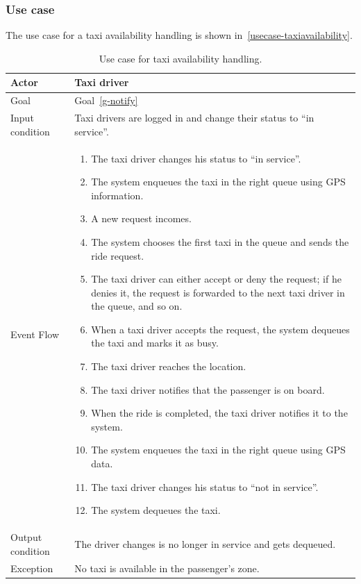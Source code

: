 \subsubsection{Use case}
The use case for a taxi availability handling is shown in~\autoref{usecase-taxiavailability}.

\begin{table}
\begin{center}
\begin{tabular}{| l | p{} |}
\hline
Actor & Taxi driver \\
\hline
Goal & Goal~\ref{g-notify}
\\
\hline
Input condition & Taxi drivers are logged in and change their status to ``in service''.  \\
\hline
Event Flow & \begin{enumerate}
	\item The taxi driver changes his status to ``in service''.
	\item The system enqueues the taxi in the right queue using GPS information.
	\item A new request incomes.
	\item The system chooses the first taxi in the queue and sends the ride request.
	\item The taxi driver can either accept or deny the request; if he denies it, the request is forwarded to the next taxi driver in the queue, and so on.
	\item When a taxi driver accepts the request, the system dequeues the taxi and marks it as busy.
	\item The taxi driver reaches the location.
	\item The taxi driver notifies that the passenger is on board.
	\item When the ride is completed, the taxi driver notifies it to the system.
	\item The system enqueues the taxi in the right queue using GPS data.
	\item The taxi driver changes his status to ``not in service''.
	\item The system dequeues the taxi.
\end{enumerate}
\\
\hline
Output condition & The driver changes is no longer in service and gets dequeued. \\
\hline
Exception & No taxi is available in the passenger's zone. \\
\hline
\end{tabular}
\end{center}
\caption{Use case for taxi availability handling.}
\label{usecase-taxiavailability}
\end{table}

